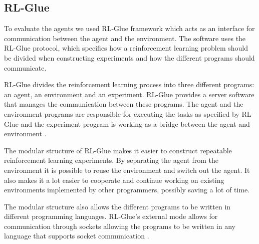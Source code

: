 \subsection{RL-Glue }
\label{sec:glue}

To evaluate the agents we used RL-Glue framework which acts as an interface for communication between the agent and the environment. The software uses the RL-Glue protocol, which specifies how a reinforcement learning problem should be divided when constructing experiments and how the different programs should communicate.

RL-Glue divides the reinforcement learning process into three different programs: an agent, an environment and an experiment. RL-Glue provides a server software that manages the communication between these programs. The agent and the environment programs are responsible for executing the tasks as specified by RL-Glue and the experiment program is working as a bridge between the agent and environment \parencite{tanner2009rl}.

The modular structure of RL-Glue makes it easier to construct repeatable reinforcement learning experiments. By separating the agent from the environment it is possible to reuse the environment and switch out the agent. It also makes it a lot easier to cooperate and continue working on existing environments implemented by other programmers, possibly saving a lot of time.

The modular structure also allows the different programs to be written in different programming languages. RL-Glue's external mode allows for communication through sockets allowing the programs to be written in any language that supports socket communication \parencite{tanner2009rl}.
